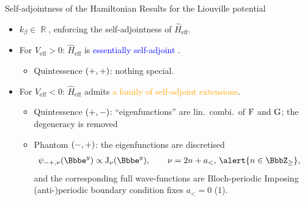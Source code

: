 \documentclass[8pt]{beamer}
\begin{document}
\begin{frame}%
{Self-adjointness of the Hamiltonian}%
{Results for the Liouville potential}
\begin{itemize}
\item $k_\beta \in \BbbR$, enforcing the self-adjointness of 
$\widehat{H}_{\text{eff}}$.

\item For $V_{\text{eff}} > 0$: $\widehat{H}_\text{eff}$ is
\textcolor{blue}{essentially self-adjoint}%
.
\begin{itemize}
\item Quintessence ${\left(+, +\right)}$: nothing special.
\end{itemize}

\item For $V_{\text{eff}} < 0$: $\widehat{H}_\text{eff}$ admits
\textcolor{orange}{a family of self-adjoint extensions}.
\begin{itemize}
\item Quintessence ${\left(+,-\right)}$: ``eigenfunctions'' are
lin.\ combi.\ of $\operatorname{F}$ and $\operatorname{G}$;
\alert{the degeneracy is removed}
\item Phantom ${\left(-, +\right)}$: the eigenfunctions are \alert{discretised}
\begin{align}
\rfun{\psi_{-+,\nu}}{\ee^y} &\propto
\rfun{\BesselJ_{\nu}}{\ee^y},\qquad \nu = 2n+a_<,\, \alert{n \in
\BbbZ_\ge},
\label{eq:Phi_nu}
\end{align}
and the corresponding full wave-functions are Bloch-periodic
Imposing (anti-)periodic boundary condition fixes $a_< = 0$ ($1$).
\end{itemize}





\end{itemize}
\end{frame}
\end{document}
